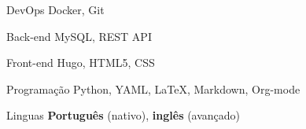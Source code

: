 

\begin{cvskills}

  \cvskill
    {DevOps} %
    {Docker, Git} %

  \cvskill
    {Back-end} %
    {MySQL, REST API} %

  \cvskill
    {Front-end} %
    {Hugo, HTML5, CSS} %

  \cvskill
    {Programação} %
    {Python, YAML, LaTeX, Markdown, Org-mode} %

  \cvskill
    {Linguas} %
    {\textbf{Português} (nativo), \textbf{inglês} (avançado)} %

\end{cvskills}
